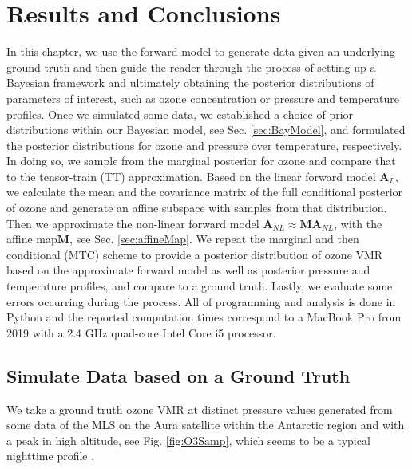 \chapter{Results and Conclusions}
\label{ch:res}
In this chapter, we use the forward model to generate data given an underlying ground truth and then guide the reader through the process of setting up a Bayesian framework and ultimately obtaining the posterior distributions of parameters of interest, such as ozone concentration or pressure and temperature profiles.
Once we simulated some data, we established a choice of prior distributions within our Bayesian model, see Sec. \ref{sec:BayModel}, and formulated the posterior distributions for ozone and pressure over temperature, respectively.
In doing so, we sample from the marginal posterior for ozone and compare that to the tensor-train (TT) approximation.
Based on the linear forward model $\bm{A}_L$, we calculate the mean and the covariance matrix of the full conditional posterior of ozone and generate an affine subspace with samples from that distribution.
Then we approximate the non-linear forward model $\bm{A}_{NL} \approx \bm{M} \bm{A}_{NL}$, with the affine map$\bm{M}$, see Sec. \ref{sec:affineMap}.
We repeat the marginal and then conditional (MTC) scheme to provide a posterior distribution of ozone VMR based on the approximate forward model as well as posterior pressure and temperature profiles, and compare to a ground truth.
Lastly, we evaluate some errors occurring during the process.
All of programming and analysis is done in Python and the reported computation times correspond to a MacBook Pro from 2019 with a 2.4 GHz quad-core Intel Core i5 processor.

\section{Simulate Data based on a Ground Truth}
We take a ground truth ozone VMR at distinct pressure values generated from some data \cite{MLSdata} of the MLS on the Aura satellite within the Antarctic region and with a peak in high altitude, see Fig. \ref{fig:O3Samp}, which seems to be a typical nighttime profile \cite{Lee2020NightOzone}.

